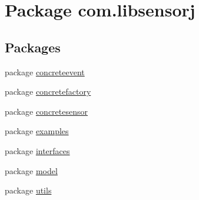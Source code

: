 \hypertarget{namespacecom_1_1libsensorj}{}\section{Package com.\+libsensorj}
\label{namespacecom_1_1libsensorj}
\subsection*{Packages}
\begin{DoxyCompactItemize}
\item 
package \hyperlink{namespacecom_1_1libsensorj_1_1concreteevent}{concreteevent}
\item 
package \hyperlink{namespacecom_1_1libsensorj_1_1concretefactory}{concretefactory}
\item 
package \hyperlink{namespacecom_1_1libsensorj_1_1concretesensor}{concretesensor}
\item 
package \hyperlink{namespacecom_1_1libsensorj_1_1examples}{examples}
\item 
package \hyperlink{namespacecom_1_1libsensorj_1_1interfaces}{interfaces}
\item 
package \hyperlink{namespacecom_1_1libsensorj_1_1model}{model}
\item 
package \hyperlink{namespacecom_1_1libsensorj_1_1utils}{utils}
\end{DoxyCompactItemize}
